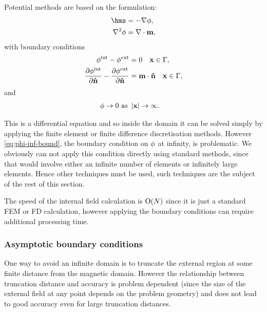 Potential methods are based on the formulation:
\begin{equation}
\begin{aligned}
  \label{eq:Hms2}
  \hms &= - \nabla \phim, \\
  \lap \phim &= \nabla \cdot \mv,
\end{aligned}
\end{equation}
with boundary conditions
\begin{equation}
  \begin{aligned}
    \label{eq:cont-phi-bound2}
    \phi^{\text{int}} - \phi^{\text{ext}} &= 0 \quad \mathbf{x} \in {\Gamma}, \\
    \frac{\partial \phi^{\text{int}}}{\partial \mathbf{\hat{n}}} - \frac{\partial \phi^{\text{ext}}}{\partial \mathbf{\hat{n}}} &= \mathbf{m} \cdot \mathbf{\hat{n}} \quad \mathbf{x} \in {\Gamma}, \\
  \end{aligned}
\end{equation}
and
\begin{equation}
  \begin{aligned}
    \label{eq:phi-inf-bound}
    \phi \rightarrow 0 \text{ as } &\left|{\mathbf{x}} \right| \rightarrow \infty.
  \end{aligned}
\end{equation}

This is a differential equation and so inside the domain it can be solved simply by applying the finite element or finite difference discretisation methods.
However \cref{eq:phi-inf-bound}, the boundary condition on $\phi$ at infinity, is problematic.
We obviously can not apply this condition directly using standard methods, since that would involve either an infinite number of elements or infinitely large elements.
Hence other techniques must be used, such techniques are the subject of the rest of this section.

The speed of the internal field calculation is $\text{O}{\left( N \right)}$ since it is just a standard FEM or FD calculation, however applying the boundary conditions can require additional processing time.


\subsubsection{Asymptotic boundary conditions}
\label{sec:asymptot-bcs}

One way to avoid an infinite domain is to truncate the external region at some finite distance from the magnetic domain.
However the relationship between truncation distance and accuracy is problem dependent (since the size of the external field at any point depends on the problem geometry) and does not lead to good accuracy even for large truncation distances.

